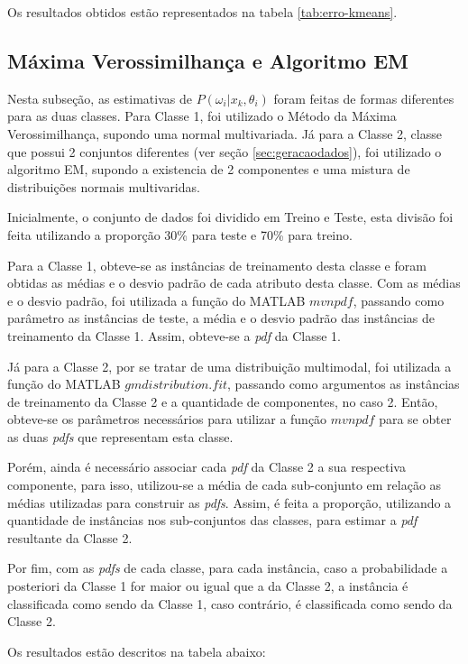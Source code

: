 Os resultados obtidos estão representados na tabela \ref{tab:erro-kmeans}.


\subsection{Máxima Verossimilhança e Algoritmo EM}
\label{subsec:exp-mle-em}

Nesta subseção, as estimativas de $P(\omega_i | x_k, \theta_i)$ foram feitas de formas diferentes para as duas classes. Para Classe 1, foi utilizado o Método da Máxima Verossimilhança, supondo uma normal multivariada. Já para a Classe 2, classe que possui 2 conjuntos diferentes (ver seção \ref{sec:geracaodados}), foi utilizado o algoritmo EM, supondo a existencia de 2 componentes e uma mistura de distribuições normais multivaridas.

Inicialmente, o conjunto de dados foi dividido em Treino e Teste, esta divisão foi feita utilizando a proporção 30\% para teste e 70\% para treino.

Para a Classe 1, obteve-se as instâncias de treinamento desta classe e foram obtidas as médias e o desvio padrão de cada atributo desta classe. Com as médias e o desvio padrão, foi utilizada a função do MATLAB $mvnpdf$, passando como parâmetro as instâncias de teste, a média e o desvio padrão das instâncias de treinamento da Classe 1. Assim, obteve-se a \textit{pdf} da Classe 1.

Já para a Classe 2, por se tratar de uma distribuição multimodal, foi utilizada a função do MATLAB $gmdistribution.fit$, passando como argumentos as instâncias de treinamento da Classe 2 e a quantidade de componentes, no caso 2. Então, obteve-se os parâmetros necessários para utilizar a função $mvnpdf$ para se obter as duas \textit{pdfs} que representam esta classe.

Porém, ainda é necessário associar cada \textit{pdf} da Classe 2 a sua respectiva componente, para isso, utilizou-se a média de cada sub-conjunto em relação as médias utilizadas para construir as \textit{pdfs}. Assim, é feita a proporção, utilizando a quantidade de instâncias nos sub-conjuntos das classes, para estimar a \textit{pdf} resultante da Classe 2.

Por fim, com as \textit{pdfs} de cada classe, para cada instância, caso a probabilidade a posteriori da Classe 1 for maior ou igual que a da Classe 2, a instância é classificada como sendo da Classe 1, caso contrário, é classificada como sendo da Classe 2.

Os resultados estão descritos na tabela abaixo:

